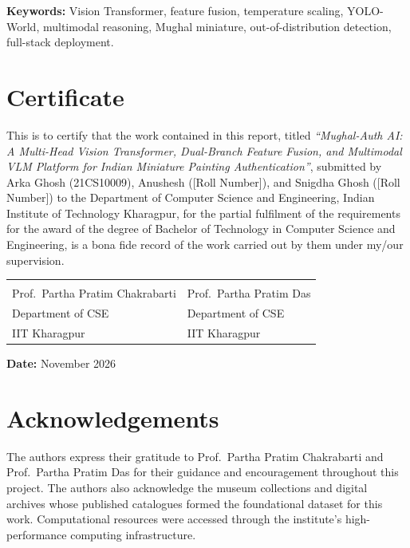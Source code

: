 \documentclass[12pt, a4paper, twoside]{article}
\begin{document}
\textbf{Keywords:} Vision Transformer, feature fusion, temperature scaling, YOLO-World, multimodal reasoning, Mughal miniature, out-of-distribution detection, full-stack deployment.

\clearpage
\section*{Certificate}

This is to certify that the work contained in this report, titled \textit{``Mughal-Auth AI: A Multi-Head Vision Transformer, Dual-Branch Feature Fusion, and Multimodal VLM Platform for Indian Miniature Painting Authentication''}, submitted by Arka Ghosh (21CS10009), Anushesh ([Roll Number]), and Snigdha Ghosh ([Roll Number]) to the Department of Computer Science and Engineering, Indian Institute of Technology Kharagpur, for the partial fulfilment of the requirements for the award of the degree of Bachelor of Technology in Computer Science and Engineering, is a bona fide record of the work carried out by them under my/our supervision.

\vspace{2cm}
\noindent
\begin{tabular}{p{6cm} p{6cm}}
  \underline{\hspace{5.5cm}} & \underline{\hspace{5.5cm}}\\
  Prof.\ Partha Pratim Chakrabarti & Prof.\ Partha Pratim Das\\
  Department of CSE & Department of CSE\\
  IIT Kharagpur & IIT Kharagpur\\
\end{tabular}

\vspace{1.5cm}
\noindent
\textbf{Date:} November 2026

\clearpage
\section*{Acknowledgements}

The authors express their gratitude to Prof.\ Partha Pratim Chakrabarti and Prof.\ Partha Pratim Das for their guidance and encouragement throughout this project. The authors also acknowledge the museum collections and digital archives whose published catalogues formed the foundational dataset for this work. Computational resources were accessed through the institute's high-performance computing infrastructure.
\end{document}
